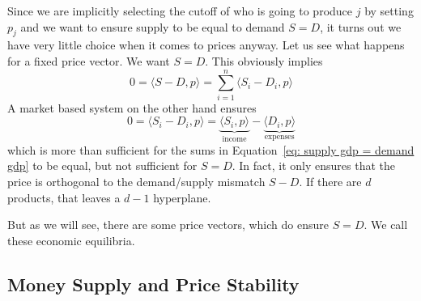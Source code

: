 Since we are implicitly selecting the cutoff of who is going to produce \(j\) by
setting \(p_j\) and we want to ensure supply to be equal to demand \(S=D\), it
turns out we have very little choice when it comes to prices anyway. Let us see
what happens for a fixed price vector. We want \(S=D\). This obviously implies
\begin{equation}
	\label{eq: supply gdp = demand gdp}
	0 =\langle S-D,p\rangle =  \sum_{i=1}^n \langle S_i - D_i, p\rangle
\end{equation}
A market based system on the other hand ensures
\[
	0 = \langle S_i - D_i, p\rangle
	= \underbrace{\langle S_i, p\rangle}_{\text{income}}
	- \underbrace{\langle D_i,p\rangle}_{\text{expenses}}
\]
which is more than sufficient for the sums in Equation~\eqref{eq: supply gdp =
demand gdp} to be equal, but not sufficient for \(S=D\). In fact, it only
ensures that the price is orthogonal to the demand/supply mismatch \(S-D\).
If there are \(d\) products, that leaves a \(d-1\) hyperplane.

But as we will see, there are some price vectors, which do ensure \(S=D\).
We call these economic equilibria.

\subsection{Money Supply and Price Stability}
\label{subsec: money supply and price stability}

